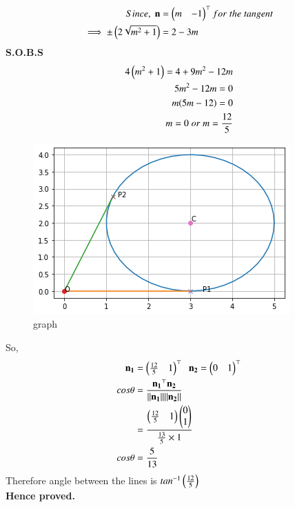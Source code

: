 \documentclass[journal,12pt,twocolumn]{IEEEtran}
\begin{document}
\begin{align}
    Since ,\; \mathbf{n} &= \begin{pmatrix}m & -1\end{pmatrix}^\top \label{eq} for \; the \; tangent\\
   \implies \pm \left(2\sqrt{m^2+1}\right)&=2-3m
\end{align}
\textbf{S.O.B.S}
\begin{align}
    4\left(m^2+1\right)=4 + 9m^2 -12m\\
    5m^2-12m=0\\
    m(5m-12)=0\\
    m=0 \;or\; m = \frac{12}{5}
\end{align}
    \begin{figure}
        \centering
        \includegraphics[width = \columnwidth]{Assignment_3.png}
        \caption{graph}
        \label{fig:my_label}
\end{figure}
So,
\begin{align}
\mathbf{n_1}&= \begin{pmatrix}\frac{12}{5} & 1\end{pmatrix}^{\top} \;\; \mathbf{n_2}=\begin{pmatrix}0 & 1\end{pmatrix}^{\top}\\
   cos \theta &= \frac{\mathbf{n_1}^{\top}\mathbf{n_2}}{\lVert\mathbf{n_1}\rVert\lVert\mathbf{n_2}\rVert}\\
   &= \frac{\begin{pmatrix}\frac{12}{5} & 1\end{pmatrix}\begin{pmatrix}0 \\ 1\end{pmatrix}}{\frac{13}{5}\times 1}\\
   cos \theta &= \frac{5}{13}
\end{align}
Therefore angle between the lines is $tan^{-1}\left(\frac{12}{5}\right)$ \\
\textbf{Hence proved.}
\end{document}
